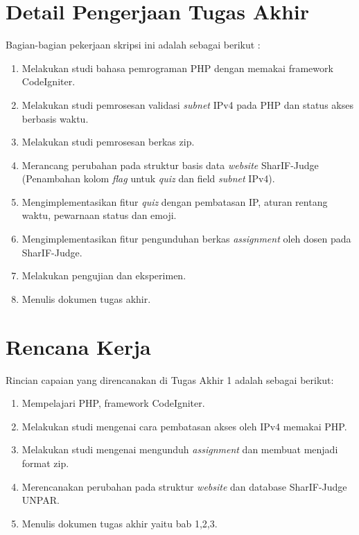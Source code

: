 \documentclass[a4paper,twoside]{article}
\begin{document}
	\section{Detail Pengerjaan Tugas Akhir}
	Bagian-bagian pekerjaan skripsi ini adalah sebagai berikut :
	\begin{enumerate}
		\item Melakukan studi bahasa pemrograman PHP dengan memakai framework CodeIgniter.
		\item Melakukan studi pemrosesan validasi \textit{subnet} IPv4 pada PHP dan status akses berbasis waktu.
		\item Melakukan studi pemrosesan berkas zip.
		\item Merancang perubahan pada struktur basis data \textit{website} SharIF-Judge (Penambahan kolom \textit{flag} untuk \textit{quiz} dan field \textit{subnet} IPv4).
		\item Mengimplementasikan fitur \textit{quiz} dengan pembatasan IP, aturan rentang waktu, pewarnaan status dan emoji.
		\item Mengimplementasikan  fitur pengunduhan berkas \textit{assignment} oleh dosen pada SharIF-Judge.
		\item Melakukan pengujian dan eksperimen.
		\item Menulis dokumen tugas akhir.
	\end{enumerate}
	
	\section{Rencana Kerja}
	Rincian capaian yang direncanakan di Tugas Akhir 1 adalah sebagai berikut:
	\begin{enumerate}
		\item Mempelajari PHP, framework CodeIgniter.
		\item Melakukan studi mengenai cara pembatasan akses oleh IPv4 memakai PHP.
		\item Melakukan studi mengenai mengunduh \textit{assignment} dan membuat menjadi format zip.
		\item Merencanakan perubahan pada struktur \textit{website} dan database SharIF-Judge UNPAR.
		\item Menulis dokumen tugas akhir yaitu bab 1,2,3.
	\end{enumerate}
	
\end{document}
